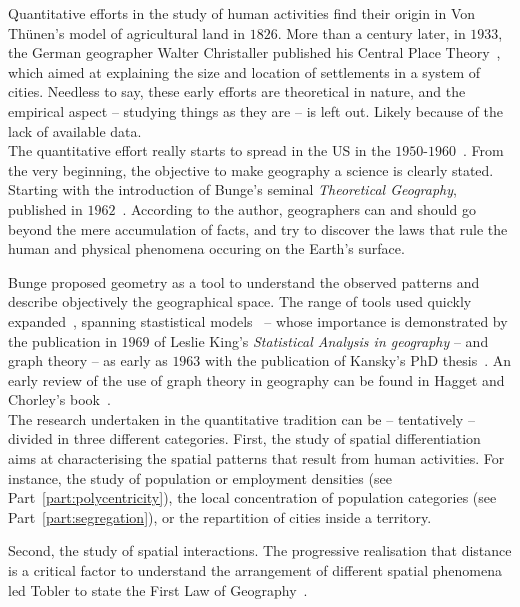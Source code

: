 Quantitative efforts in the study of human activities find their origin in Von
Th\"unen's model of agricultural land in $1826$. More than a century later,
in $1933$, the German geographer Walter Christaller published his Central Place
Theory~\cite{Christaller:1933}, which aimed at explaining the size and location
of settlements in a system of cities. Needless to say, these early efforts are
theoretical in nature, and the empirical aspect -- studying things as they are
-- is left out. Likely because of the lack of available data.\\

The quantitative effort really starts to spread in the US in the
$1950$-$1960$~\cite{Berry:1993}. From the very beginning, the objective to make
geography a science is clearly stated. Starting with the introduction of Bunge's
seminal \emph{Theoretical Geography}, published in $1962$~\cite{Bunge:1962}.
According to the author, geographers can and should go beyond the mere
accumulation of facts, and try to discover the laws that rule the human and
physical phenomena occuring on the Earth's surface.   

Bunge proposed geometry as a tool to understand the observed patterns and
describe objectively the geographical space. The range of tools used quickly
expanded~\cite{Haggett:1966,Chorley:1968}, spanning stastistical
models~\cite{King:1969, Brunsdon:1998} -- whose importance is demonstrated by
the publication in $1969$ of Leslie King's \emph{Statistical Analysis in
geography} -- and graph theory  -- as early as $1963$ with the publication of
Kansky's PhD thesis~\cite{Kansky:1963}. An early review of the use of graph
theory in geography can be found in Hagget and Chorley's
book~\cite{Haggett:1969}.\\

The research undertaken in the quantitative tradition can be -- tentatively --
divided in three different categories. First, the study of spatial
differentiation aims at characterising the spatial patterns that result from
human activities. For instance, the study of population or employment densities
(see Part~\ref{part:polycentricity}), the local concentration of population
categories (see Part~\ref{part:segregation}), or the repartition of cities
inside a territory. 

Second, the study of spatial interactions. The progressive realisation that
distance is a critical factor to understand the arrangement of different spatial
phenomena led Tobler to state the First Law of Geography~\cite{Tobler:1970}. 

